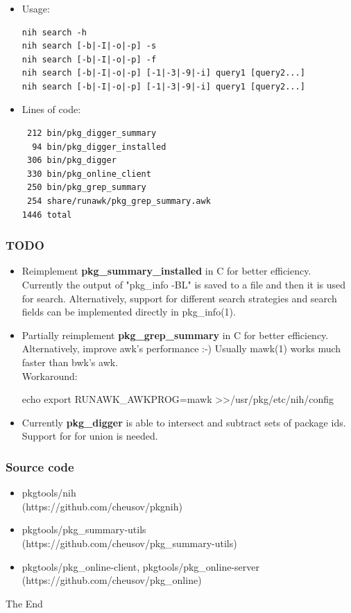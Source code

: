 \documentclass[hyperref=unicode,ascii,xcolor=dvipsnames]{beamer}
\begin{document}
\begin{frame}[fragile]
  \frametitle{}
  \begin{itemize}
  \item Usage:
\begin{verbatim}
nih search -h
nih search [-b|-I|-o|-p] -s
nih search [-b|-I|-o|-p] -f
nih search [-b|-I|-o|-p] [-1|-3|-9|-i] query1 [query2...]
nih search [-b|-I|-o|-p] [-1|-3|-9|-i] query1 [query2...]
\end{verbatim}
\item Lines of code:
\begin{verbatim}
 212 bin/pkg_digger_summary
  94 bin/pkg_digger_installed
 306 bin/pkg_digger
 330 bin/pkg_online_client
 250 bin/pkg_grep_summary
 254 share/runawk/pkg_grep_summary.awk
1446 total
\end{verbatim}
  \end{itemize}
\end{frame}

\begin{frame}[fragile]
  \frametitle{TODO}
  \begin{itemize}
  \item Reimplement {\bf pkg\_summary\_installed} in C for better efficiency.
Currently the output of "pkg\_info -BL" is saved to a file and then it is used for search.
Alternatively, support for different search strategies and search fields
can be implemented directly in pkg\_info(1).
  \item Partially reimplement {\bf pkg\_grep\_summary} in C for better efficiency.
Alternatively, improve awk's performance :-) Usually mawk(1) works much faster
than bwk's awk.\\
{\footnotesize Workaround:}\\
\begin{CodeNoLabelSmallest}
echo export RUNAWK\_AWKPROG=mawk \textgreater\textgreater /usr/pkg/etc/nih/config
\end{CodeNoLabelSmallest}
  \item Currently {\bf pkg\_digger} is able to intersect and subtract sets of package ids.
    Support for for union is needed.
  \end{itemize}
\end{frame}

\begin{frame}[fragile]
  \frametitle{Source code}
  \begin{itemize}
  \item pkgtools/nih\\
    (https://github.com/cheusov/pkgnih)
  \item pkgtools/pkg\_summary-utils\\
    (https://github.com/cheusov/pkg\_summary-utils)
  \item pkgtools/pkg\_online-client, pkgtools/pkg\_online-server\\
    (https://github.com/cheusov/pkg\_online)
  \end{itemize}
  \begin{center}
    \Huge{The End}
  \end{center}
\end{frame}

\end{document}
